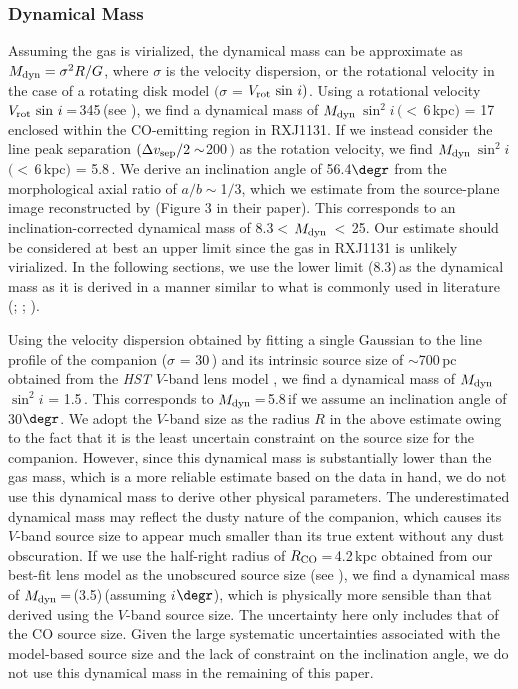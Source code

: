 \documentclass[]{emulateapj}
\begin{document}
\subsubsection{Dynamical Mass}
Assuming the gas is virialized,
the dynamical mass can be approximate as
$M_{\rm dyn} = \sigma^2 R / G$,
where $\sigma$ is the velocity dispersion, or the rotational velocity in the case of a rotating disk model
$($\ie $\sigma$ = $V_{\rm rot}\, \sin\, i)$.
Using a rotational velocity $V_{\rm rot} \, \sin\, i$\,=\,345\,\kms (see ),  %
we find a dynamical mass of
$M_{\rm dyn}$\,$\sin^2 i$\,$(<$\,6\,kpc$)$ = 17\,\Msun enclosed
within the CO-emitting region in RXJ1131.
If we instead consider the
\bco line peak separation $(\Delta v_{\rm sep}/2 \sim$200\,\kms$)$ as the rotation velocity, we find
$M_{\rm dyn}$\,$\sin^2 i$\,$(<$\,6\,kpc$)$ = 5.8\,\Msun. %
We derive an inclination angle of 56.4$\degr$ from the
morphological axial ratio of $a/b\sim$1$/$3, which we estimate
from the source-plane image reconstructed by  (Figure 3 in their paper).  
This corresponds to an inclination-corrected dynamical mass of
8.3\Msun$<$\,$M_{\rm dyn}$\,$<$\,25\Msun.
Our estimate should be considered at best an upper limit since
the gas in RXJ1131 is unlikely virialized.
In the following sections, we use the
lower limit (8.3)\,\Msun as the dynamical mass as it is
derived in a manner similar to what is commonly used in literature 
(\eg {}; \citealt[hereafter DS98]{Downes98a}; ).

Using the velocity dispersion obtained by fitting a single Gaussian to the
line profile of the companion ($\sigma$ = 30\,\kms)
and its intrinsic source size of $\sim$700\,pc obtained from the {\em HST}
$V$-band lens model ,
we find a dynamical mass of $M_{\rm dyn}$\,$\sin^2 i$ = 1.5\,\Msun.
This corresponds to $M_{\rm dyn}$\,=\,5.8\,\Msun if we assume an
inclination angle of 30$\degr$.
We adopt the $V$-band size as the radius $R$ in the above estimate 
owing to the fact that it is the least uncertain constraint on the source size for the companion.
However, since this dynamical mass is substantially lower than the gas mass, which is 
a more reliable estimate based on the data in hand, 
we do not use this dynamical mass to derive other physical parameters.
The underestimated dynamical mass may reflect
the dusty nature of the companion, which causes its $V$-band source size to 
appear much smaller than its true extent without any dust obscuration.
If we use the half-right radius of $R_{\rm CO}$\,=\,4.2\,kpc obtained from our best-fit lens 
model as the unobscured source size (see ), we find a dynamical mass of 
$M_{\rm dyn}$\,=\,(3.5)\,\Msun (assuming $i$$\degr$), which is physically more sensible 
than that derived using the $V$-band source size. 
The uncertainty here only includes that of the CO source size.
Given the large systematic uncertainties associated with the model-based source size and
the lack of constraint on the inclination angle, we do not use this dynamical mass in the remaining of this paper.
\end{document}
